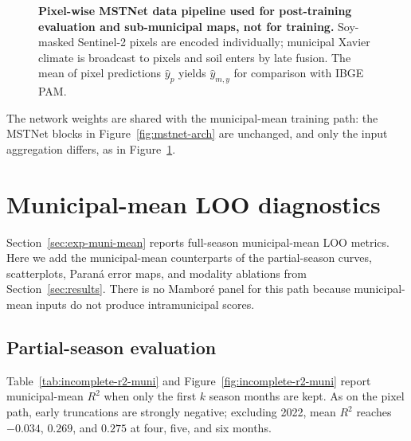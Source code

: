 \begin{figure}[!htbp]
{%
}
\caption{\textbf{Pixel-wise MSTNet data pipeline used for post-training evaluation and sub-municipal maps, not for training.}
Soy-masked Sentinel-2 pixels are encoded individually; municipal Xavier climate is broadcast to pixels and soil enters by late fusion.
The mean of pixel predictions $\hat{y}_p$ yields $\hat{y}_{m,y}$ for comparison with IBGE PAM.}
\label{fig:data-flow-pixel}
\end{figure}

The network weights are shared with the municipal-mean training path: the MSTNet blocks in Figure~\ref{fig:mstnet-arch} are unchanged, and only the input aggregation differs, as in Figure~\ref{fig:data-flow-pixel}.

\section{Municipal-mean LOO diagnostics}
\label{app:muni-mean-eval}
Section~\ref{sec:exp-muni-mean} reports full-season municipal-mean LOO metrics.
Here we add the municipal-mean counterparts of the partial-season curves, scatterplots, Paraná error maps, and modality ablations from Section~\ref{sec:results}.
There is no Mambor\'{e} panel for this path because municipal-mean inputs do not produce intramunicipal scores.

\subsection{Partial-season evaluation}
Table~\ref{tab:incomplete-r2-muni} and Figure~\ref{fig:incomplete-r2-muni} report municipal-mean $R^2$ when only the first $k$ season months are kept.
As on the pixel path, early truncations are strongly negative; excluding 2022, mean $R^2$ reaches $-0.034$, $0.269$, and $0.275$ at four, five, and six months.

